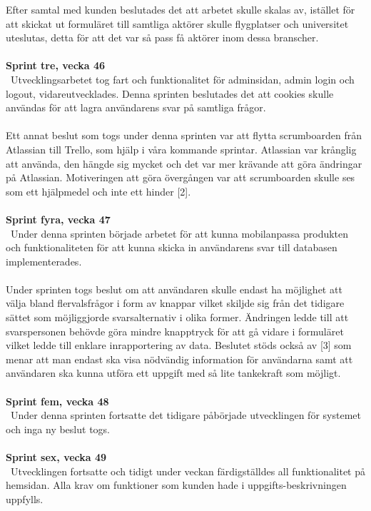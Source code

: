 \documentclass[12pt]{article}
\begin{document}
Efter samtal med kunden beslutades det att arbetet skulle skalas av, istället för att skickat ut formuläret till samtliga aktörer skulle flygplatser och universitet uteslutas, detta för att det var så pass få aktörer inom dessa branscher.
\\\\
\textbf{Sprint tre, vecka 46} \\\
Utvecklingsarbetet tog fart och funktionalitet för adminsidan, admin login och logout, vidareutvecklades. Denna sprinten beslutades det att cookies skulle användas för att lagra användarens svar på samtliga frågor.\\\\
Ett annat beslut som togs under denna sprinten var att flytta scrumboarden från Atlassian till Trello, som hjälp i våra kommande sprintar. Atlassian var krånglig att använda, den hängde sig mycket och det var mer krävande att göra ändringar på Atlassian. Motiveringen att göra övergången var att scrumboarden skulle ses som ett hjälpmedel och inte ett hinder [2].\\\\
\textbf{Sprint fyra, vecka 47} \\\
Under denna sprinten började arbetet för att kunna mobilanpassa produkten och funktionaliteten för att kunna skicka in användarens svar till databasen implementerades.\\\\
Under sprinten togs beslut om att användaren skulle endast ha möjlighet att välja bland flervalsfrågor i form av knappar vilket skiljde sig från det tidigare sättet som möjliggjorde svarsalternativ i olika former. Ändringen ledde till att svarspersonen behövde göra mindre knapptryck för att gå vidare i formuläret vilket ledde till enklare inrapportering av data. Beslutet stöds också av [3] som menar att man endast ska visa nödvändig information för användarna samt att användaren ska kunna utföra ett uppgift med så lite tankekraft som möjligt.\\\\
\textbf{Sprint fem, vecka 48} \\\
Under denna sprinten fortsatte det tidigare påbörjade utvecklingen för systemet och inga ny beslut togs. \\\\
\textbf{Sprint sex, vecka 49} \\\
Utvecklingen fortsatte och tidigt under veckan färdigställdes all funktionalitet på hemsidan. Alla krav om funktioner som kunden hade i uppgifts-beskrivningen uppfylls.
\end{document}
